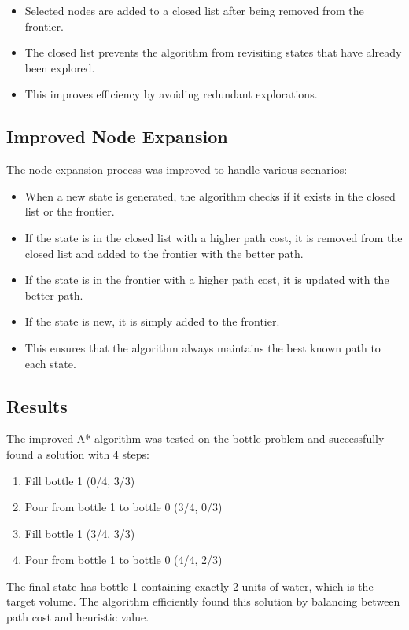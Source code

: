 \documentclass[12pt,a4paper]{article}
\begin{document}
\begin{itemize}
    \item Selected nodes are added to a closed list after being removed from the frontier.
    \item The closed list prevents the algorithm from revisiting states that have already been explored.
    \item This improves efficiency by avoiding redundant explorations.
\end{itemize}

\subsection{Improved Node Expansion}

The node expansion process was improved to handle various scenarios:

\begin{itemize}
    \item When a new state is generated, the algorithm checks if it exists in the closed list or the frontier.
    \item If the state is in the closed list with a higher path cost, it is removed from the closed list and added to the frontier with the better path.
    \item If the state is in the frontier with a higher path cost, it is updated with the better path.
    \item If the state is new, it is simply added to the frontier.
    \item This ensures that the algorithm always maintains the best known path to each state.
\end{itemize}

\subsection{Results}

The improved A* algorithm was tested on the bottle problem and successfully found a solution with 4 steps:

\begin{enumerate}
    \item \textcolor{sectioncolor}{Fill bottle 1 (0/4, 3/3)}
    \item \textcolor{subsectioncolor}{Pour from bottle 1 to bottle 0 (3/4, 0/3)}
    \item \textcolor{sectioncolor}{Fill bottle 1 (3/4, 3/3)}
    \item \textcolor{subsectioncolor}{Pour from bottle 1 to bottle 0 (4/4, 2/3)}
\end{enumerate}

The final state has bottle 1 containing exactly 2 units of water, which is the target volume. The algorithm efficiently found this solution by balancing between path cost and heuristic value.
\end{document}
